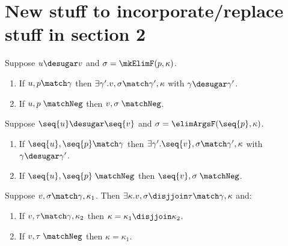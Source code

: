 \section{New stuff to incorporate/replace stuff in section 2}

\begin{lemma}
   \label{lem:match-domains-agree}
   Suppose $u \desugar v$ and $\sigma = \mkElimF(p, \kappa)$.
   \begin{enumerate}
      \item If $u, p \match \gamma$ then $\exists \gamma'.v, \sigma \match \gamma', \kappa$ with $\gamma \desugar \gamma'$.
      \item If $u, p\;\matchNeg$ then $v, \sigma\;\matchNeg$.
   \end{enumerate}
\end{lemma}

\begin{lemma}
   Suppose $\seq{u} \desugar \seq{v}$ and $\sigma = \elimArgsF(\seq{p}, \kappa)$.
   \begin{enumerate}
      \item If $\seq{u}, \seq{p} \match \gamma$ then $\exists \gamma'.\seq{v}, \sigma \match \gamma', \kappa$ with $\gamma \desugar \gamma'$.
      \item If $\seq{u}, \seq{p}\;\matchNeg$ then $\seq{v}, \sigma\;\matchNeg$.
   \end{enumerate}
\end{lemma}

\begin{lemma}
   \label{lem:match-increasing}
   Suppose $v, \sigma \match \gamma, \kappa_1$. Then $\exists \kappa.v, \sigma \disjjoin \tau \match \gamma, \kappa$ and:
   \begin{enumerate}
      \item If $v, \tau \match \gamma, \kappa_2$ then $\kappa = \kappa_1 \disjjoin \kappa_2$.
      \item If $v, \tau\;\matchNeg$ then $\kappa = \kappa_1$.
   \end{enumerate}
\end{lemma}

